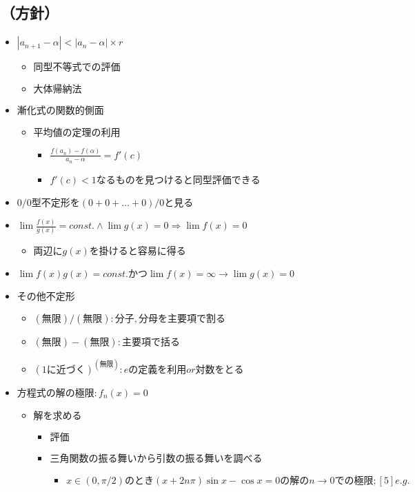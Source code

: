 \documentclass[dvipdfmx,uplatex]{jsarticle}
\begin{document}
\subsection{（方針）}
\begin{itemize}
	\item $ |a_{n+1} - α| < |a_{n} - α| \times r$
	\begin{itemize}
		\item $ 同型不等式での評価$
		\item $ 大体帰納法$
	\end{itemize}
	\item $ 漸化式の関数的側面$
	\begin{itemize}
		\item $ 平均値の定理の利用$
		\begin{itemize}
			\item $ \frac{f(a_n) - f(α)}{a_n - α} = f'(c)$
			\item $ f'(c) < 1なるものを見つけると同型評価できる$
		\end{itemize}
	\end{itemize}
	\item $ 0/0型不定形を(0+0+...+0)/0と見る$
	\item $ \lim \frac{f(x)}{g(x)} = const. ∧ \lim g(x) = 0 ⇒ \lim f(x) = 0$
	\begin{itemize}
		\item $ 両辺にg(x)を掛けると容易に得る$
	\end{itemize}
	\item $ \lim f(x)g(x) = const. かつ \lim f(x) = \infty \rightarrow \lim g(x) = 0$
	\item $ その他不定形$
	\begin{itemize}
		\item $ (無限)/(無限): 分子,分母を主要項で割る$
		\item $ (無限)-(無限): 主要項で括る$
		\item $ {(1に近づく)}^{(無限)}: eの定義を利用or対数をとる$
	\end{itemize}
	\item $ 方程式の解の極限: f_n(x) = 0$
	\begin{itemize}
		\item $ 解を求める$
		\begin{itemize}
			\item $ 評価$
			\item $ 三角関数の振る舞いから引数の振る舞いを調べる$
			\begin{itemize}
				\item $x \in (0,\pi /2)のとき(x+2n \pi ) \sin x - \cos x=0の解のn \rightarrow 0での極限;[5]e.g.$

\end{itemize}
\end{itemize}
\end{itemize}
\end{itemize}
\end{document}

